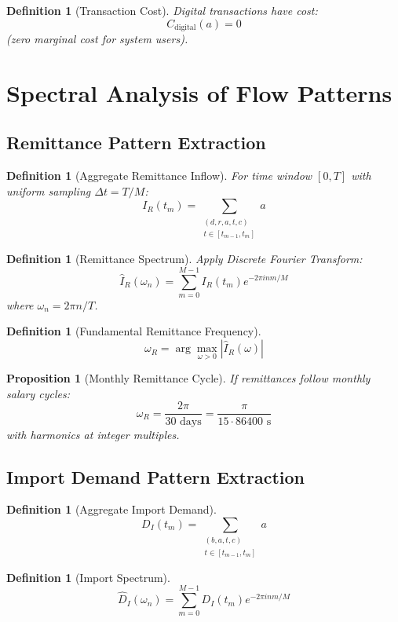\documentclass[12pt]{article}
\newtheorem{definition}[theorem]{Definition}
\newtheorem{proposition}[theorem]{Proposition}
\begin{document}
\begin{definition}[Transaction Cost]
Digital transactions have cost:
$$
C_{\text{digital}}(a) = 0
$$
(zero marginal cost for system users).
\end{definition}

\section{Spectral Analysis of Flow Patterns}

\subsection{Remittance Pattern Extraction}

\begin{definition}[Aggregate Remittance Inflow]
For time window $[0,T]$ with uniform sampling $\Delta t = T/M$:
$$
I_R(t_m) = \sum_{\substack{(d,r,a,t,c) \\ t \in [t_{m-1}, t_m]}} a
$$
\end{definition}

\begin{definition}[Remittance Spectrum]
Apply Discrete Fourier Transform:
$$
\hat{I}_R(\omega_n) = \sum_{m=0}^{M-1} I_R(t_m) e^{-2\pi i nm/M}
$$
where $\omega_n = 2\pi n/T$.
\end{definition}

\begin{definition}[Fundamental Remittance Frequency]
$$
\omega_R = \arg\max_{\omega > 0} |\hat{I}_R(\omega)|
$$
\end{definition}

\begin{proposition}[Monthly Remittance Cycle]
If remittances follow monthly salary cycles:
$$
\omega_R = \frac{2\pi}{30 \text{ days}} = \frac{\pi}{15 \cdot 86400 \text{ s}}
$$
with harmonics at integer multiples.
\end{proposition}

\subsection{Import Demand Pattern Extraction}

\begin{definition}[Aggregate Import Demand]
$$
D_I(t_m) = \sum_{\substack{(b,a,t,c) \\ t \in [t_{m-1}, t_m]}} a
$$
\end{definition}

\begin{definition}[Import Spectrum]
$$
\hat{D}_I(\omega_n) = \sum_{m=0}^{M-1} D_I(t_m) e^{-2\pi i nm/M}
$$
\end{definition}
\end{document}
